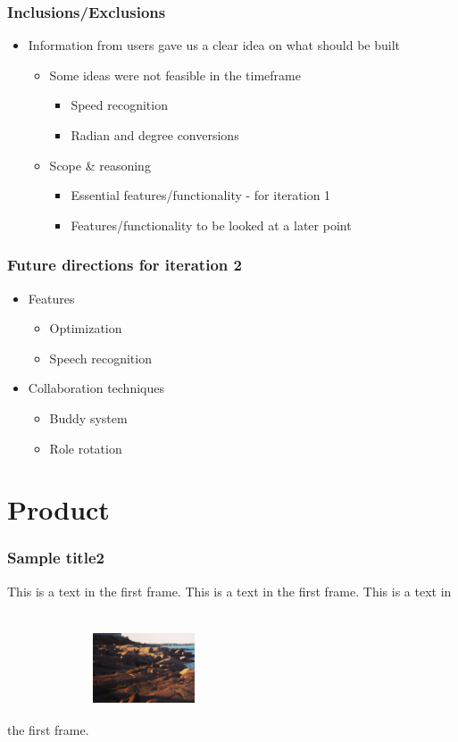 \documentclass{beamer}
\begin{document}
  \begin{frame}
  \frametitle{Inclusions/Exclusions}
  \begin{itemize}
   \item Information from users gave us a clear idea on what should be built
    \begin{itemize}
    \item Some ideas were not feasible in the timeframe
    \begin{itemize}
      \item Speed recognition
      \item Radian and degree conversions
    \end{itemize}
    \item Scope \& reasoning
      \begin{itemize}
      \item Essential features/functionality - for iteration 1
      \item Features/functionality to be looked at a later point
    \end{itemize}
    \end{itemize}
    \end{itemize}
  \end{frame}


  \begin{frame}
  \frametitle{Future directions for iteration 2}
  \begin{itemize}
   \item Features
    \begin{itemize}
     \item Optimization
     \item Speech recognition
    \end{itemize}
   \item Collaboration techniques
    \begin{itemize}
     \item Buddy system
     \item Role rotation
    \end{itemize}
  \end{itemize}
  \end{frame}



\section{Product}
\begin{frame}
\frametitle{Sample title2}
This is a text in the first frame. This is a text in the first frame. This is a text in the first frame.
\includegraphics[width=3cm, height=4cm]{Screen Shot}
\end{frame}

  
\end{document}
